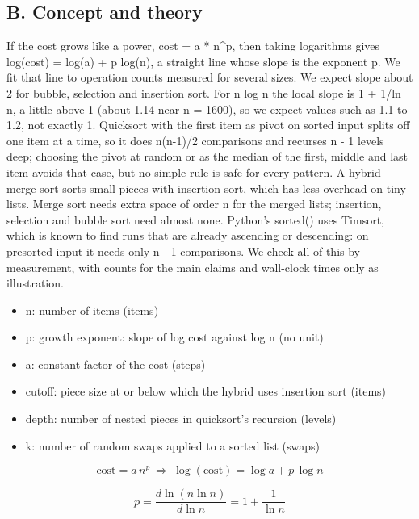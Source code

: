 \documentclass[11pt,a4paper]{article}
\begin{document}
\subsection*{B. Concept and theory}
If the cost grows like a power, cost = a * n\textasciicircum{}p, then taking logarithms gives log(cost) = log(a) + p log(n), a straight line whose slope is the exponent p. We fit that line to operation counts measured for several sizes. We expect slope about 2 for bubble, selection and insertion sort. For n log n the local slope is 1 + 1/ln n, a little above 1 (about 1.14 near n = 1600), so we expect values such as 1.1 to 1.2, not exactly 1. Quicksort with the first item as pivot on sorted input splits off one item at a time, so it does n(n-1)/2 comparisons and recurses n - 1 levels deep; choosing the pivot at random or as the median of the first, middle and last item avoids that case, but no simple rule is safe for every pattern. A hybrid merge sort sorts small pieces with insertion sort, which has less overhead on tiny lists. Merge sort needs extra space of order n for the merged lists; insertion, selection and bubble sort need almost none. Python's sorted() uses Timsort, which is known to find runs that are already ascending or descending: on presorted input it needs only n - 1 comparisons. We check all of this by measurement, with counts for the main claims and wall-clock times only as illustration.

\begin{itemize}[nosep]
\item n: number of items (items)
\item p: growth exponent: slope of log cost against log n (no unit)
\item a: constant factor of the cost (steps)
\item cutoff: piece size at or below which the hybrid uses insertion sort (items)
\item depth: number of nested pieces in quicksort's recursion (levels)
\item k: number of random swaps applied to a sorted list (swaps)
\end{itemize}

\begin{equation*}
\text{cost}=a\,n^{p}\ \Longrightarrow\ \log(\text{cost})=\log a+p\,\log n
\end{equation*}

\begin{equation*}
p=\frac{d\ln(n\ln n)}{d\ln n}=1+\frac{1}{\ln n}
\end{equation*}
\end{document}
